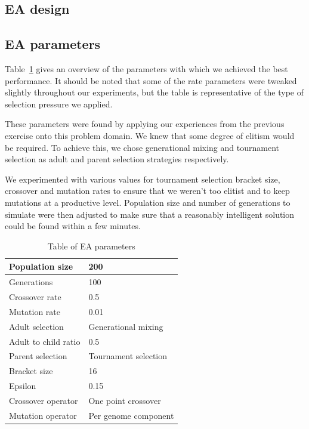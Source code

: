 \documentclass[twoside]{article}
\begin{document}
\begin{multicols}{2} %

  \section{EA design}

  \subsection{EA parameters}

  Table~\ref{tbl:ea-parameters} gives an overview of the parameters with which we achieved the best performance.
  It should be noted that some of the rate parameters were tweaked slightly throughout our experiments, but the table is representative of the type of selection pressure we applied.
  
  These parameters were found by applying our experiences from the previous exercise onto this problem domain.
  We knew that some degree of elitism would be required.
  To achieve this, we chose generational mixing and tournament selection as adult and parent selection strategies respectively.
  
  We experimented with various values for tournament selection bracket size, crossover and mutation rates to ensure that we weren't too elitist and to keep mutations at a productive level.
  Population size and number of generations to simulate were then adjusted to make sure that a reasonably intelligent solution could be found within a few minutes.
  
  \begin{table}[H]
    \begin{tabular}{|l|l|}
      \hline
      Population size                   & 200                  \\ \hline
      Generations                       & 100                  \\ \hline
      Crossover rate                    & 0.5                  \\ \hline
      Mutation rate                     & 0.01                 \\ \hline
      Adult selection                   & Generational mixing  \\ \hline
      Adult to child ratio              & 0.5                  \\ \hline
      Parent selection                  & Tournament selection \\ \hline
      Bracket size                      & 16                   \\ \hline
      Epsilon                           & 0.15                 \\ \hline
      Crossover operator                & One point crossover  \\ \hline
      Mutation operator                 & Per genome component \\ \hline
    \end{tabular}
    \caption{Table of EA parameters}
    \label{tbl:ea-parameters}
  \end{table}




\end{multicols}
\end{document}
